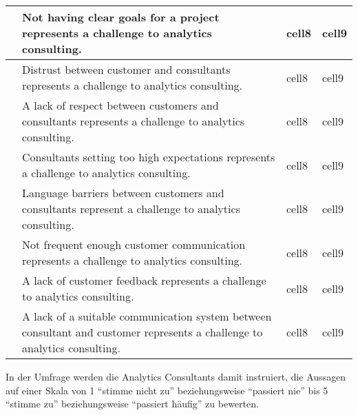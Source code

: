 \documentclass[../main.tex]{subfiles}
\begin{document}
\begin{small}
\begin{xltabular}[h]{\linewidth}{| N X | m{2.2cm} | m{1.5cm} |}
        \hline
        \label{q:8}&\hspace{-0.8em}Not having clear goals for a project represents a challenge to analytics consulting. & cell8 & cell9 \\
        \hline
        \label{q:9}&\hspace{-0.8em}Distrust between customer and consultants represents a challenge to analytics consulting. & cell8 & cell9 \\
        \hline
        \label{q:10}&\hspace{-0.8em}A lack of respect between customers and consultants represents a challenge to analytics consulting. & cell8 & cell9 \\
        \hline
        \label{q:11}&\hspace{-0.8em}Consultants setting too high expectations represents a challenge to analytics consulting. & cell8 & cell9 \\
        \hline
        \label{q:12}&\hspace{-0.8em}Language barriers between customers and consultants represent a challenge to analytics consulting. & cell8 & cell9 \\
        \hline
        \label{q:13}&\hspace{-0.8em}Not frequent enough customer communication represents a challenge to analytics consulting. & cell8 & cell9 \\
        \hline
        \label{q:14}&\hspace{-0.8em}A lack of customer feedback represents a challenge to analytics consulting. & cell8 & cell9 \\
        \hline
        \label{q:15}&\hspace{-0.8em}A lack of a suitable communication system between consultant and customer represents a challenge to analytics consulting. & cell8 & cell9 \\
        \hline
    \end{xltabular}
\end{small}

In der Umfrage werden die Analytics Consultants damit instruiert, die Aussagen auf einer Skala von 1 ``stimme nicht zu'' beziehungsweise ``passiert nie'' bis 5 ``stimme zu'' beziehungsweise ``passiert häufig'' zu bewerten.
\end{document}
